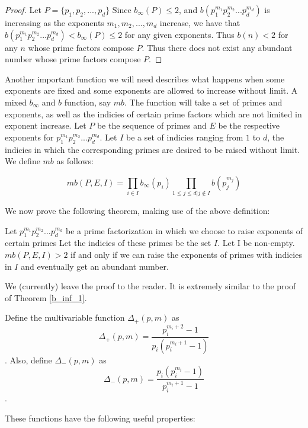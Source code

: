 \documentclass[../paper.tex]{article}
\begin{document}
\begin{proof}
Let $P = \{p_1, p_2, ..., p_d\}$
Since $b_{\infty}(P) \leq 2$, and $b(p_1^{m_1} p_2^{m_2} ... p_d^{m_d})$
is increasing as the exponents $m_1, m_2, ..., m_d$ increase, we have that
$b(p_1^{m_1} p_2^{m_2} ... p_d^{m_d}) < b_{\infty}(P) \leq 2$ for any 
given exponents. Thus $b(n) < 2$ for any $n$ whose prime factors
compose $P$. Thus there does not exist any abundant number whose 
prime factors compose $P$.

\end{proof}

Another important function we will need describes what happens 
when some exponents are fixed and some exponents are allowed to
increase without limit. A mixed $b_{\infty}$ and $b$ function, 
say $mb$. The function will take a set of primes and exponents,
as well as the indicies of certain prime factors which are not
limited in exponent increase. Let $P$ be the sequence of primes 
and $E$ be the respective exponents for 
$p_1^{m_1} p_2^{m_2} ... p_d^{m_d}$. Let $I$ be a set of indicies
ranging from $1$ to $d$, the indicies in which the corresponding
primes are desired to be raised without limit. We define $mb$ as 
follows:

\begin{equation}\label{mb_def}
  mb(P,E,I) = \prod_{i \in I} b_{\infty}(p_i) 
  \prod_{1 \leq j \leq d | j \notin I} b(p_j^{m_j})
\end{equation}

We now prove the following theorem, making use of the above definition:

\begin{theorem}
Let $p_1^{m_1} p_2^{m_2} ... p_d^{m_d}$ be a prime factorization 
in which we choose to raise exponents of certain primes Let the 
indicies of these primes be the set $I$. Let I be non-empty.
$mb(P,E,I) > 2$ if and only if we can raise the exponents of primes with 
indicies in $I$ and eventually get an abundant number.
\end{theorem}

We (currently) leave the proof to the reader. It is extremely 
similar to the proof of Theorem {\ref{b_inf_1}}.

Define the multivariable function $\Delta_+(p,m)$ as
$$\Delta_+(p,m) = \frac{p_i^{m_i+2} - 1}{ p_i (p_i^{m_i + 1} -
1)}$$. 
Also, define $\Delta_-(p,m)$ as 
$$\Delta_-(p,m) = \frac{p_i(p_i^{m_i} - 1)}{ p_i^{m_i + 1} - 1}$$.

These functions have the following useful properties:
\end{document}
